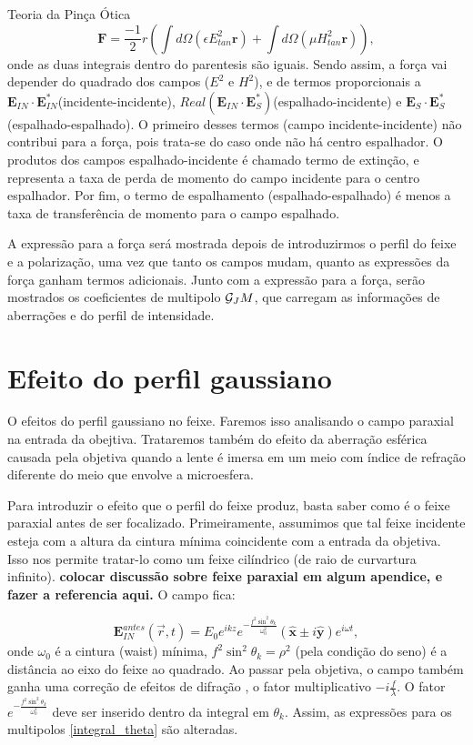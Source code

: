 \begin{chapter}{Teoria da Pinça Ótica}
\begin{equation}
{\mathbf F}=\frac{-1}{2}r\left( \int d\Omega (\epsilon E^2_{tan}{\mathbf r}) + \int d\Omega (\mu H^2_{tan}{\mathbf r}) \right),
\end{equation}
%
onde as duas integrais dentro do parentesis são iguais. Sendo assim, a força vai depender do quadrado dos campos ($E^2$ e $H^2$), e de termos proporcionais a ${\mathbf E}_{IN}\cdot{\mathbf E}_{IN}^*$(incidente-incidente), $Real({\mathbf E}_{IN}\cdot{\mathbf E}_S^*)$(espalhado-incidente) e ${\mathbf E}_S\cdot{\mathbf E}_S^*$(espalhado-espalhado). O primeiro desses termos (campo incidente-incidente) não contribui para a força, pois trata-se do caso onde não há centro espalhador. O produtos dos campos espalhado-incidente é chamado termo de extinção, e representa a taxa de perda de momento do campo incidente para o centro espalhador. Por fim, o termo de espalhamento (espalhado-espalhado) é menos a taxa de transferência de momento para o campo espalhado.

A expressão para a força será mostrada depois de introduzirmos o perfil do feixe e a polarização, uma vez que tanto os campos mudam, quanto as expressões da força ganham termos adicionais. Junto com a expressão para a força, serão mostrados os coeficientes de multipolo $\mathcal G_JM$, que carregam as informações de aberrações e do perfil de intensidade.

\section{Efeito do perfil gaussiano}

\hspace{5 mm}O efeitos do perfil gaussiano no feixe. Faremos isso analisando o campo paraxial na entrada da obejtiva. Trataremos também do efeito da aberração esférica causada pela objetiva quando a lente é imersa em um meio com índice de refração diferente do meio que envolve a microesfera. 

Para introduzir o efeito que o perfil do feixe produz, basta saber como é o feixe paraxial antes de ser focalizado. Primeiramente, assumimos que tal feixe incidente esteja com a altura da cintura mínima coincidente com a entrada da objetiva. Isso nos permite tratar-lo como um feixe cilíndrico (de raio de curvartura infinito). {\bf colocar discussão sobre feixe paraxial em algum apendice, e fazer a referencia aqui.} O campo fica:

\begin{equation}
{\mathbf E}_{IN}^{antes}(\vec{r},t)=E_0 e^{ikz} e^{-\frac{f^2\sin^2\theta_k}{\omega_0^2}}(\hat{{\mathbf x}}\pm i\hat{{\mathbf y}}) e^{i\omega t},
\label{campo_ent}
\end{equation}
%
onde $\omega_0$ é a cintura (waist) mínima, $f^2\sin^2\theta_k=\rho^2$ (pela condição do seno) é a distância ao eixo do feixe ao quadrado. Ao passar pela objetiva, o campo também ganha uma correção de efeitos de difração \cite{RICHARDSeWOLF}, o fator multiplicativo $-i\frac{f}{\lambda}$. O fator $e^{-\frac{f^2\sin^2\theta_k}{\omega_0^2}}$ deve ser inserido dentro da integral em $\theta_k$. Assim, as expressões para os multipolos \ref{integral_theta} são alteradas.


\end{chapter}
